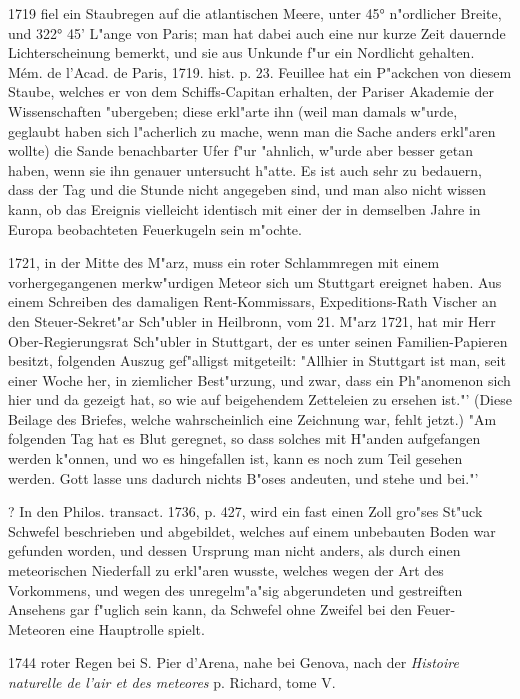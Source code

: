 \documentclass[a4paper, 11pt, oneside, polutonikogreek, german]{article}
\begin{document}
1719 fiel ein Staubregen auf die atlantischen Meere, unter 45° n"ordlicher Breite, und 322° 45' L"ange von Paris; man hat dabei auch eine nur kurze Zeit dauernde Lichterscheinung bemerkt, und sie aus Unkunde f"ur ein Nordlicht gehalten. Mém. de l'Acad. de Paris, 1719. hist. p. 23. Feuillee hat ein P"ackchen von diesem Staube, welches er von dem Schiffs-Capitan erhalten, der Pariser Akademie der Wissenschaften "ubergeben; diese erkl"arte ihn (weil man damals w"urde, geglaubt haben sich l"acherlich zu mache, wenn man die Sache anders erkl"aren wollte) die Sande benachbarter Ufer f"ur "ahnlich, w"urde aber besser getan haben, wenn sie ihn genauer untersucht h"atte. Es ist auch sehr zu bedauern, dass der Tag und die Stunde nicht angegeben sind, und man also nicht wissen kann, ob das Ereignis vielleicht identisch mit einer der in demselben Jahre in Europa beobachteten Feuerkugeln sein m"ochte.

1721, in der Mitte des M"arz, muss ein roter Schlammregen mit einem vorhergegangenen merkw"urdigen Meteor sich um Stuttgart ereignet haben. Aus einem Schreiben des damaligen Rent-Kommissars, Expeditions-Rath Vischer an den Steuer-Sekret"ar Sch"ubler in Heilbronn, vom 21. M"arz 1721, hat mir Herr Ober-Regierungsrat Sch"ubler in Stuttgart, der es unter seinen Familien-Papieren besitzt, folgenden Auszug gef"alligst mitgeteilt: "Allhier in Stuttgart ist man, seit einer Woche her, in ziemlicher Best"urzung, und zwar, dass ein Ph"anomenon sich hier und da gezeigt hat, so wie auf beigehendem Zetteleien zu ersehen ist."' (Diese Beilage des Briefes, welche wahrscheinlich eine Zeichnung war, fehlt jetzt.) "Am folgenden Tag hat es Blut geregnet, so dass solches mit H"anden aufgefangen werden k"onnen, und wo es hingefallen ist, kann es noch zum Teil gesehen werden. Gott lasse uns dadurch nichts B"oses andeuten, und stehe und bei."'

? In den Philos. transact. 1736, p. 427, wird ein fast einen Zoll gro"ses St"uck Schwefel beschrieben und abgebildet, welches auf einem unbebauten Boden war gefunden worden, und dessen Ursprung man nicht anders, als durch einen meteorischen Niederfall zu erkl"aren wusste, welches wegen der Art des Vorkommens, und wegen des unregelm"a"sig abgerundeten und gestreiften Ansehens gar f"uglich sein kann, da Schwefel ohne Zweifel bei den Feuer-Meteoren eine Hauptrolle spielt.

1744 roter Regen bei S. Pier d'Arena, nahe bei Genova, nach der \emph{Histoire naturelle de l'air et des meteores} p. Richard, tome V.
\end{document}
